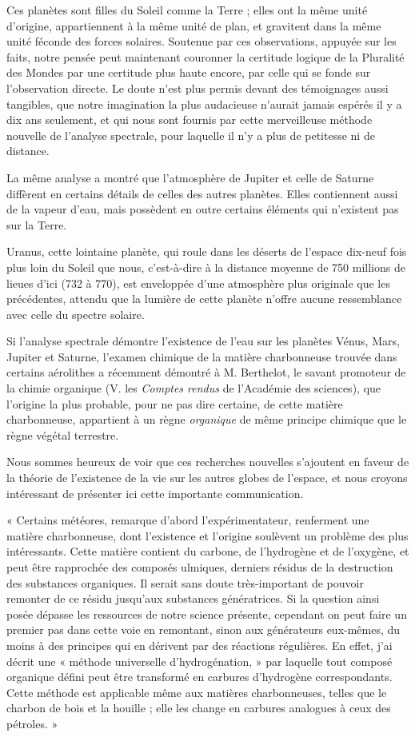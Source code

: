 \documentclass[a4paper, 11pt, oneside, landscape]{article}
\begin{document}
Ces planètes sont filles du Soleil comme la Terre ; elles ont la même unité d'origine, appartiennent à la même unité de plan, et gravitent dans la même unité féconde des forces solaires. Soutenue par ces observations, appuyée sur les faits, notre pensée peut maintenant couronner la certitude logique de la Pluralité des Mondes par une certitude plus haute encore, par celle qui se fonde sur l'observation directe. Le doute n'est plus permis devant des témoignages aussi tangibles, que notre imagination la plus audacieuse n'aurait jamais espérés il y a dix ans seulement, et qui nous sont fournis par cette merveilleuse méthode nouvelle de l'analyse spectrale, pour laquelle il n'y a plus de petitesse ni de distance.

La même analyse a montré que l'atmosphère de Jupiter et celle de Saturne diffèrent en certains détails de celles des autres planètes. Elles contiennent aussi de la vapeur d'eau, mais possèdent en outre certains éléments qui n'existent pas sur la Terre.

Uranus, cette lointaine planète, qui roule dans les déserts de l'espace dix-neuf fois plus loin du Soleil que nous, c'est-à-dire à la distance moyenne de 750 millions de lieues d'ici (732 à 770), est enveloppée d'une atmosphère plus originale que les précédentes, attendu que la lumière de cette planète n'offre aucune ressemblance avec celle du spectre solaire.

Si l'analyse spectrale démontre l'existence de l'eau sur les planètes Vénus, Mars, Jupiter et Saturne, l'examen chimique de la matière charbonneuse trouvée dans certains aérolithes a récemment démontré à M. Berthelot, le savant promoteur de la chimie organique (V. les \emph{Comptes rendus} de l'Académie des sciences), que l'origine la plus probable, pour ne pas dire certaine, de cette matière charbonneuse, appartient à un règne \emph{organique} de même principe chimique que le règne végétal terrestre.

Nous sommes heureux de voir que ces recherches nouvelles s'ajoutent en faveur de la théorie de l'existence de la vie sur les autres globes de l'espace, et nous croyons intéressant de présenter ici cette importante communication.

« Certains météores, remarque d'abord l'expérimentateur, renferment une matière charbonneuse, dont l'existence et l'origine soulèvent un problème des plus intéressants. Cette matière contient du carbone, de l'hydrogène et de l'oxygène, et peut être rapprochée des composés ulmiques, derniers résidus de la destruction des substances organiques. Il serait sans doute très-important de pouvoir remonter de ce résidu jusqu'aux substances génératrices. Si la question ainsi posée dépasse les ressources de notre science présente, cependant on peut faire un premier pas dans cette voie en remontant, sinon aux générateurs eux-mêmes, du moins à des principes qui en dérivent par des réactions régulières. En effet, j'ai décrit une « méthode universelle d'hydrogénation, » par laquelle tout composé organique défini peut être transformé en carbures d'hydrogène correspondants. Cette méthode est applicable même aux matières charbonneuses, telles que le charbon de bois et la houille ; elle les change en carbures analogues à ceux des pétroles. »
\end{document}
